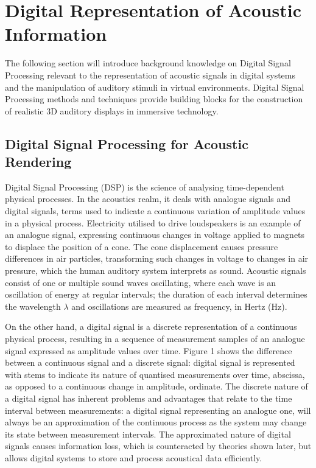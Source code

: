\section{Digital Representation of Acoustic Information}
\label{sec:DSP-background}
The following section will introduce background knowledge on Digital Signal Processing relevant to the representation of acoustic signals in digital systems and the manipulation of auditory stimuli in virtual environments. Digital Signal Processing methods and techniques provide building blocks for the construction of realistic 3D auditory displays in immersive technology.

\subsection{Digital Signal Processing for Acoustic Rendering}
Digital Signal Processing (DSP) is the science of analysing time-dependent physical processes. In the acoustics realm, it deals with analogue signals and digital signals, terms used to indicate a continuous variation of amplitude values in a physical process. Electricity utilised to drive loudspeakers is an example of an analogue signal, expressing continuous changes in voltage applied to magnets to displace the position of a cone. The cone displacement causes pressure differences in air particles, transforming such changes in voltage to changes in air pressure, which the human auditory system interprets as sound. Acoustic signals consist of one or multiple sound waves oscillating, where each wave is an oscillation of energy at regular intervals; the duration of each interval determines the wavelength $\lambda$ and oscillations are measured as frequency, in Hertz (Hz). \par
On the other hand, a digital signal is a discrete representation of a continuous physical process, resulting in a sequence of measurement samples of an analogue signal expressed as amplitude values over time. Figure 1 shows the difference between a continuous signal and a discrete signal: digital signal is represented with stems to indicate its nature of quantised measurements over time, abscissa, as opposed to a continuous change in amplitude, ordinate. The discrete nature of a digital signal has inherent problems and advantages that relate to the time interval between measurements: a digital signal representing an analogue one, will always be an approximation of the continuous process as the system may change its state between measurement intervals. The approximated nature of digital signals causes information loss, which is counteracted by theories shown later, but allows digital systems to store and process acoustical data efficiently. \par
